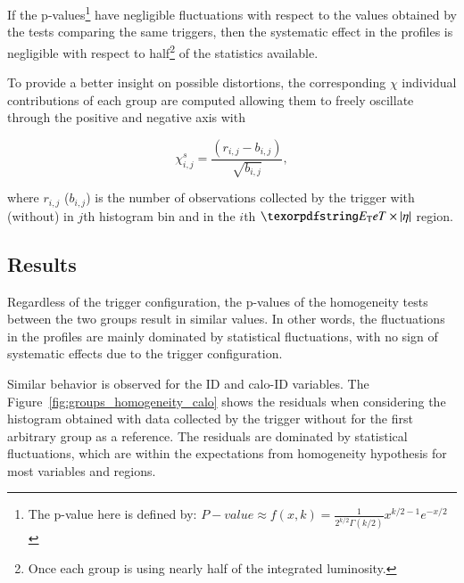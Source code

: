 If the p-values\footnote{The p-value here is defined by: $P-value \approx f(x, k) = \frac{1}{2^{k/2}\Gamma(k/2)}x^{k/2 -1}e^{-x/2}$} have negligible fluctuations with respect to the values obtained by the tests comparing the same triggers, then the systematic effect in the profiles is negligible with respect to half\footnote{Once each group is using nearly half of the integrated luminosity.} of the statistics available.



To provide a better insight on possible distortions, the corresponding $\chi$
individual contributions of each group are computed allowing them to freely
oscillate through the positive and negative axis with

\begin{equation}
  \chi_{i,j}^{s} = \frac{(r_{i,j} - b_{i,j})}{\sqrt{b_{i,j}}},
  \label{eq:signed_chi}
\end{equation}

\noindent where $r_{i,j}$ ($b_{i,j}$) is the number of observations collected by
the trigger with (without) \rnn{} in $j$th histogram bin and in the $i$th
$\et{}\times\abseta{}$ region.


\subsection{Results}\label{top:agreement_homogeneity_results}




Regardless of the trigger configuration, the p-values of the homogeneity tests between the two groups result in similar values. In other words, the fluctuations in the profiles are mainly dominated by statistical fluctuations, with no sign of systematic effects due to the trigger configuration. 

Similar behavior is observed for the ID and calo-ID variables. The Figure~\ref{fig:groups_homogeneity_calo} shows the residuals when considering the histogram obtained with data collected by the trigger without \rnn{} for the first arbitrary group as a reference. The residuals are dominated by statistical fluctuations, which are within the expectations from homogeneity hypothesis for most variables and regions.


